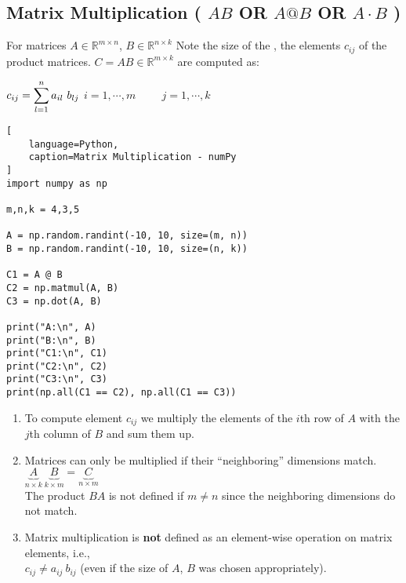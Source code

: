 \subsection{Matrix Multiplication ( $AB$ OR $A @ B$ OR $A\cdot B$ ) \cite{mfml/book/mml/Deisenroth-Faisal-Ong}}

For matrices $A \in \mathbb{R}^{m\times n}$, $B \in \mathbb{R}^{n\times k}$ Note the size of the , the elements $c_{ij}$ of the product matrices. $C = AB \in \mathbb{R}^{m\times k}$ are computed as:

\vspace{0.5cm}
\hfill
$
    c_{ij} = \dsum_{l=1}^n a_{il}\ b_{lj}
$
\hfill
$
    i = 1,\cdots,m
    \hspace{1cm}
    j = 1,\cdots,k
$
\hfill \cite{mfml/book/mml/Deisenroth-Faisal-Ong}





\begin{lstlisting}[
    language=Python,
    caption=Matrix Multiplication - numPy
]
import numpy as np

m,n,k = 4,3,5

A = np.random.randint(-10, 10, size=(m, n))
B = np.random.randint(-10, 10, size=(n, k))

C1 = A @ B
C2 = np.matmul(A, B)
C3 = np.dot(A, B)

print("A:\n", A)
print("B:\n", B)
print("C1:\n", C1)
print("C2:\n", C2)
print("C3:\n", C3)
print(np.all(C1 == C2), np.all(C1 == C3))
\end{lstlisting}




\vspace{0.5cm}

\begin{enumerate}
    \item To compute element $c_{ij}$ we multiply the elements of the $i$th row of $A$ with the $j$th column of $B$ and sum them up.
    \hfill \cite{mfml/book/mml/Deisenroth-Faisal-Ong}

    \item Matrices can only be multiplied if their “neighboring” dimensions match.
    \hfill \cite{mfml/book/mml/Deisenroth-Faisal-Ong}
    \\
    \hfill
    $
        \underset{n\times k}{\underbrace{A}}\
        \underset{k\times m}{\underbrace{B}}
        =
        \underset{n\times m}{\underbrace{C}}
    $
    \hfill \cite{mfml/book/mml/Deisenroth-Faisal-Ong}
    \\
    The product $BA$ is not defined if $m \neq n$ since the neighboring dimensions do not match.

    \item Matrix multiplication is \textbf{not} defined as an element-wise operation on matrix elements, i.e., 
    \\
    $c_{ij} \neq a_{ij}\ b_{ij}$ (even if the size of $A$, $B$ was chosen appropriately).
    \hfill \cite{mfml/book/mml/Deisenroth-Faisal-Ong}
\end{enumerate}


